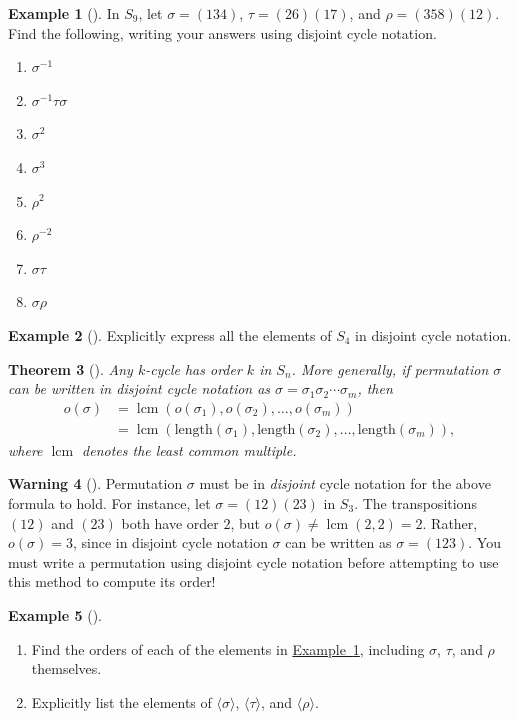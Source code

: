 \documentclass[10pt,]{book}
\theoremstyle{plain}
\newtheorem{theorem}{Theorem}[section]
\theoremstyle{definition}
\theoremstyle{definition}
\newtheorem{warning}[theorem]{Warning}
\theoremstyle{definition}
\newtheorem{example}[theorem]{Example}
\theoremstyle{definition}
\numberwithin{equation}{section}
\DeclareMathOperator{\lcm}{lcm}
\newcommand{\amp}{&}
\begin{document}
\begin{example}[]\label{s9ex}
In \(S_9\), let \(\sigma=(134)\), \(\tau=(26)(17)\), and \(\rho=(358)(12)\). Find the following, writing your answers using disjoint cycle notation.%
\leavevmode%
\begin{enumerate}
\item\hypertarget{li-321}{}\(\sigma^{-1}\)%
\item\hypertarget{li-322}{}\(\sigma^{-1}\tau\sigma\)%
\item\hypertarget{li-323}{}\(\sigma^2\)%
\item\hypertarget{li-324}{}\(\sigma^3\)%
\item\hypertarget{li-325}{}\(\rho^2\)%
\item\hypertarget{li-326}{}\(\rho^{-2}\)%
\item\hypertarget{li-327}{}\(\sigma \tau\)%
\item\hypertarget{li-328}{}\(\sigma \rho\)%
\end{enumerate}
\end{example}
\begin{example}[]\label{example-56}
Explicitly express all the elements of \(S_4\) in disjoint cycle notation.%
\end{example}
\begin{theorem}[{}]\label{kcyc}
Any \(k\)-cycle has order \(k\) in \(S_n\). More generally, if permutation \(\sigma\) can be written in disjoint cycle notation as \(\sigma=\sigma_1 \sigma_2 \cdots \sigma_m\), then%
\begin{align*}
o(\sigma)\amp =\lcm(o(\sigma_1), o(\sigma_2),\ldots, o(\sigma_m))\\
\amp =\lcm(\mathrm{length}(\sigma_1),\mathrm{length}(\sigma_2),\ldots,\mathrm{length}(\sigma_m)),
\end{align*}
where \(\lcm\) denotes the least common multiple.%
\end{theorem}
\begin{warning}[]\label{warning-21}
Permutation \(\sigma\) must be in \emph{disjoint} cycle notation for the above formula to hold. For instance, let \(\sigma=(12)(23)\) in \(S_3\). The transpositions \((12)\) and \((23)\) both have order \(2\), but \(o(\sigma)\neq \lcm(2,2)=2\). Rather, \(o(\sigma)=3\), since in disjoint cycle notation \(\sigma\) can be written as \(\sigma=(123)\). You must write a permutation using disjoint cycle notation before attempting to use this method to compute its order!%
\end{warning}
\begin{example}[]\label{example-57}
\leavevmode%
\begin{enumerate}
\item\hypertarget{li-329}{}Find the orders of each of the elements in \hyperref[s9ex]{Example~\ref{s9ex}}, including \(\sigma\), \(\tau\), and \(\rho\) themselves.%
\item\hypertarget{li-330}{}Explicitly list the elements of \(\langle \sigma\rangle\), \(\langle \tau\rangle\), and \(\langle \rho\rangle\).%
\end{enumerate}
\end{example}
\typeout{************************************************}
\typeout{************************************************}
\end{document}
